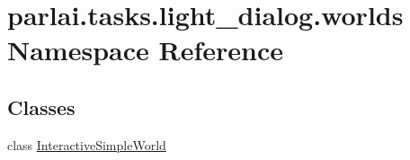 \hypertarget{namespaceparlai_1_1tasks_1_1light__dialog_1_1worlds}{}\section{parlai.\+tasks.\+light\+\_\+dialog.\+worlds Namespace Reference}
\label{namespaceparlai_1_1tasks_1_1light__dialog_1_1worlds}
\subsection*{Classes}
\begin{DoxyCompactItemize}
\item 
class \hyperlink{classparlai_1_1tasks_1_1light__dialog_1_1worlds_1_1InteractiveSimpleWorld}{Interactive\+Simple\+World}
\end{DoxyCompactItemize}
